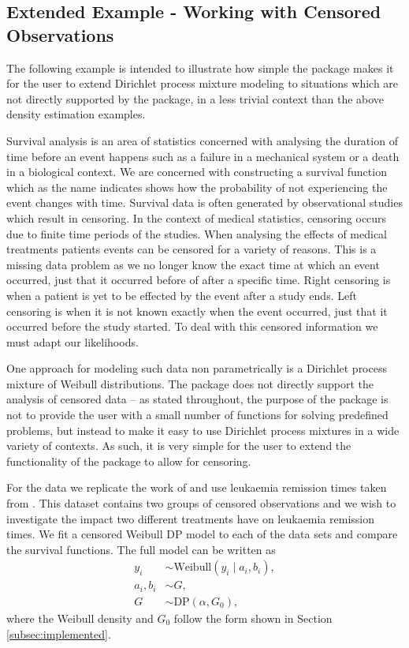 \documentclass[nojss]{jss}
\begin{document}
\subsection{Extended Example - Working with Censored Observations}
The following example is intended to illustrate how simple the  package makes it for the user to extend Dirichlet process mixture modeling to situations which are not directly supported by the package, in a less trivial context than the above density estimation examples.

Survival analysis is an area of statistics concerned with analysing the duration of time before an event happens such as a failure in a mechanical system or a death in a biological context. We are concerned with constructing a survival function which as the name indicates shows how the probability of not experiencing the event changes with time. Survival data is often generated by observational studies which result in censoring. In the context of medical statistics, censoring occurs due to finite time periods of the studies. When analysing the effects of medical treatments patients events can be censored for a variety of reasons. This is a missing data problem as we no longer know the exact time at which an event occurred, just that it occurred before of after a specific time. Right censoring is when a patient is yet to be effected by the event after a study ends. Left censoring is when it is not known exactly when the event occurred, just that it occurred before the study started. To deal with this censored information we must adapt our likelihoods.

One approach for modeling such data non parametrically is a Dirichlet process mixture of Weibull distributions. The  package does not directly support the analysis of censored data -- as stated throughout, the purpose of the package is not to provide the user with a small number of functions for solving predefined problems, but instead to make it easy to use Dirichlet process mixtures in a wide variety of contexts. As such, it is very simple for the user to extend the functionality of the package to allow for censoring.

For the data we replicate the work of \cite{kottas_nonparametric_2006} and use leukaemia remission times taken from \cite{lawless_statistical_2011}. This dataset contains two groups of censored observations and we wish to investigate the impact two different treatments have on leukaemia remission times. We fit a censored Weibull DP model to each of the data sets and compare the survival functions. The full model can be written as
\begin{align*}
y _i & \sim \text{Weibull} ( y_i \mid a_i , b_i ), \\
a_i , b_i & \sim G, \\
G & \sim  \text{DP} (\alpha , G_0),
\end{align*}
where the Weibull density and $G_0$ follow the form shown in Section \ref{subsec:implemented}.
\end{document}
